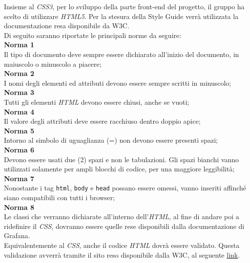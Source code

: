 Insieme al \textit{CSS3}, per lo sviluppo della parte front-end del progetto, il gruppo ha scelto di utilizzare \textit{HTML5}. Per la stesura della Style Guide verrà utilizzata la documentazione resa disponibile da W3C.\\
Di seguito saranno riportate le principali norme da seguire: \\
	\textbf{Norma 1}\\
		Il tipo di documento deve sempre essere dichiarato all'inizio del documento, in maiuscolo o minuscolo a piacere; \\
	\textbf{Norma 2}\\
		I nomi degli elementi ed attributi devono essere sempre scritti in minuscolo; \\
	\textbf{Norma 3}\\
		Tutti gli elementi \textit{HTML} devono essere chiusi, anche se vuoti; \\
	\textbf{Norma 4}\\
		Il valore degli attributi deve essere racchiuso dentro doppio apice;\\
	\textbf{Norma 5}\\
		Intorno al simbolo di uguaglianza (=) non devono essere presenti spazi;\\
	\textbf{Norma 6}\\
		Devono essere usati due (2) spazi e non le tabulazioni. Gli spazi bianchi vanno utilizzati solamente per ampli blocchi di codice, per una maggiore leggibilità; \\
	\textbf{Norma 7}\\
		Nonostante i tag \texttt{html}, 	\texttt{body} e \texttt{head} possano essere omessi, vanno inseriti affinché siano compatibili con tutti i browser;\\
	\textbf{Norma 8}\\
		Le classi che verranno dichiarate all'interno dell'\textit{HTML}, al fine di andare poi a ridefinire il \textit{CSS}, dovranno essere quelle rese disponibili dalla documentazione di Grafana.	\\


Equivalentemente al \textit{CSS}, anche il codice \textit{HTML} dovrà essere validato. Questa validazione avverrà tramite il sito reso disponibile dalla W3C, al seguente \href{https://validator.w3.org/}{link}.


